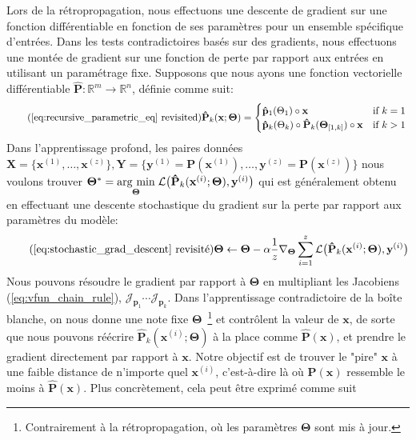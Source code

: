 Lors de la rétropropagation, nous effectuons une descente de gradient sur une fonction différentiable en fonction de ses paramètres pour un ensemble spécifique d'entrées. Dans les tests contradictoires basés sur des gradients, nous effectuons une montée de gradient sur une fonction de perte par rapport aux entrées en utilisant un paramétrage fixe. Supposons que nous ayons une fonction vectorielle différentiable $\mathbf{\hat P}: \mathbb{R}^m\rightarrow\mathbb{R}^n$, définie comme suit:
%
\begin{equation} \tag{\autoref{eq:recursive_parametric_eq} revisited}
\mathbf{\hat P}_k(\mathbf{x}; \bm\Theta) = \begin{cases} \mathbf{\hat p}_1(\Theta_1)\circ\mathbf{x} &\text{if } k=1\\ \mathbf{\hat p}_k(\Theta_k)\circ \mathbf{\hat P}_{k}(\bm\Theta_{[1, k]})\circ\mathbf{x}&\text{if } k > 1 \end{cases} \\
\end{equation}
%
Dans l'apprentissage profond, les paires données $\mathbf{X} = \{\mathbf{x}^{(1)}, \dots, \mathbf{x}^{(z)}\}, \mathbf{Y} = \{\mathbf{y}^{(1)} = \mathbf{P}(\mathbf{x}^{(1)}), \dots, \mathbf{y}^{(z)} = \mathbf{P}(\mathbf{x}^{(z)})\}$ nous voulons trouver $\bm\Theta^* = \underset{\boldsymbol{\Theta}}{\operatorname{arg}\,\operatorname{min}}\;\mathcal{L}\big(\mathbf{\hat P}_k(\mathbf{x}^{(i)}; \bm\Theta), \mathbf{y}^{(i)}\big)$ qui est généralement obtenu en effectuant une descente stochastique du gradient sur la perte par rapport aux paramètres du modèle:
%
\begin{equation} \tag{\autoref{eq:stochastic_grad_descent} revisité}
\bm\Theta \leftarrow \bm\Theta - \alpha\frac{1}{z}\nabla_{\bm\Theta} \sum_{i=1}^z\mathcal{L}\big(\mathbf{\hat P}_k(\mathbf{x}^{(i)}; \bm\Theta), \mathbf{y}^{(i)}\big)
\end{equation}
%
Nous pouvons résoudre le gradient par rapport à $\bm\Theta$ en multipliant les Jacobiens (\autoref{eq:vfun_chain_rule}), $\mathcal{J}_{\mathbf{p}_1} \cdots \mathcal{J}_{\mathbf{p}_k}$. Dans l'apprentissage contradictoire de la boîte blanche, on nous donne une note fixe $\bm\Theta$~\footnote{ Contrairement à la rétropropagation, où les paramètres $\bm\Theta$ sont mis à jour. } et contrôlent la valeur de $\mathbf x$, de sorte que nous pouvons réécrire $\mathbf{\hat P}_k(\mathbf{x}^{(i)};\bm\Theta)$ à la place comme $\mathbf{\hat P}(\mathbf x)$, et prendre le gradient directement par rapport à $\mathbf x$. Notre objectif est de trouver le "pire" $\mathbf x$ à une faible distance de n'importe quel $\mathbf x^{(i)}$, c'est-à-dire là où $\mathbf{P}(\mathbf x)$ ressemble le moins à $\mathbf{\hat P}(\mathbf x)$. Plus concrètement, cela peut être exprimé comme suit
